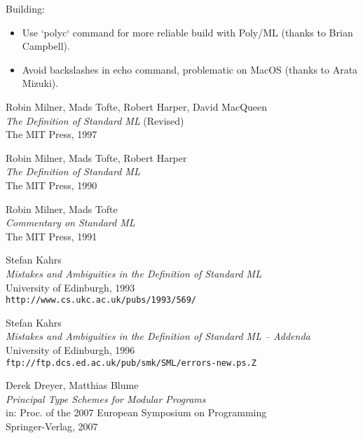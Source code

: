 \documentclass[twoside,titlepage]{article}
\begin{document}
\begin{appendix}
Building:
\begin{itemize}[nolistsep]
\item Use `polyc` command for more reliable build with Poly/ML (thanks to Brian Campbell).
\item Avoid backslashes in echo command, problematic on MacOS (thanks to Arata Mizuki).
\end{itemize}



\vfill
\pagebreak
\begin{thebibliography}{MTHM97}

Robin Milner, Mads Tofte, Robert Harper, David MacQueen \\
{\it The Definition of Standard ML} (Revised) \\
The MIT Press, 1997

Robin Milner, Mads Tofte, Robert Harper \\
{\it The Definition of Standard ML} \\
The MIT Press, 1990

Robin Milner, Mads Tofte \\
{\it Commentary on Standard ML} \\
The MIT Press, 1991

Stefan Kahrs \\
{\it Mistakes and Ambiguities in the Definition of Standard ML} \\
University of Edinburgh, 1993 \\
{\small\tt{http://www.cs.ukc.ac.uk/pubs/1993/569/}}

Stefan Kahrs \\
{\it Mistakes and Ambiguities in the Definition of Standard ML -- Addenda} \\
University of Edinburgh, 1996 \\
{\small\tt{ftp://ftp.dcs.ed.ac.uk/pub/smk/SML/errors-new.ps.Z}}

Derek Dreyer, Matthias Blume \\
{\it Principal Type Schemes for Modular Programs} \\
in: Proc. of the 2007 European Symposium on Programming \\
Springer-Verlag, 2007


\end{thebibliography}
\end{appendix}
\end{document}
